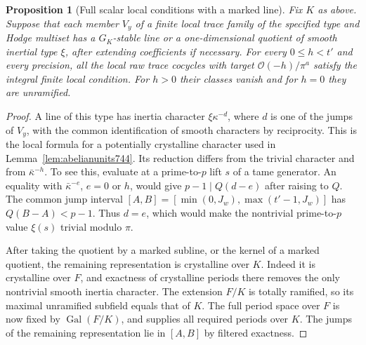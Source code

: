 \documentclass[a4paper,11pt]{article}
\newtheorem{proposition}{Proposition}[section]
\theoremstyle{definition}
\theoremstyle{remark}
\numberwithin{equation}{section}
\begin{document}
\begin{proposition}[Full scalar local conditions with a marked line]
\leavevmode\label{prop:markedFL747}
Fix \(K\) as above. Suppose that each member \(V_y\) of a finite
local trace family of the specified type and Hodge multiset has
a \(G_K\)-stable line or a one-dimensional quotient of smooth
inertial type \(\xi\), after extending coefficients if necessary.
For every \(0\le h<t'\) and every precision, all the local raw
trace cocycles with target \(\mathcal O(-h)/\pi^a\) satisfy
the integral finite local condition. For \(h>0\) their classes
vanish and for \(h=0\) they are unramified.
\end{proposition}
\begin{proof}
A line of this type has inertia character \(\xi\kappa^{-d}\),
where \(d\) is one of the jumps of \(V_y\), with the common
identification of smooth characters by reciprocity. This is
the local formula for a potentially crystalline character used
in Lemma~\ref{lem:abelianunits744}. Its reduction differs from
the trivial character and from \(\bar\kappa^{-h}\). To see this,
evaluate at a prime-to-\(p\) lift \(s\) of a tame generator.
An equality with \(\bar\kappa^{-e}\), \(e=0\) or \(h\), would give
\(p-1\mid Q(d-e)\) after raising to \(Q\). The common jump
interval \([A,B]=[\min(0,J_w),\max(t'-1,J_w)]\) has
\(Q(B-A)<p-1\). Thus \(d=e\), which would make the nontrivial
prime-to-\(p\) value \(\xi(s)\) trivial modulo \(\pi\).

After taking the quotient by a marked subline, or the kernel of
a marked quotient, the remaining representation is crystalline
over \(K\). Indeed it is crystalline over \(F\), and exactness
of crystalline periods there removes the only nontrivial smooth
inertia character. The extension \(F/K\) is totally ramified,
so its maximal unramified subfield equals that of \(K\).
The full period space over \(F\) is now fixed by
\(\operatorname{Gal}(F/K)\), and supplies all required periods
over \(K\). The jumps of the remaining representation lie in
\([A,B]\) by filtered exactness.


\end{proof}
\end{document}
